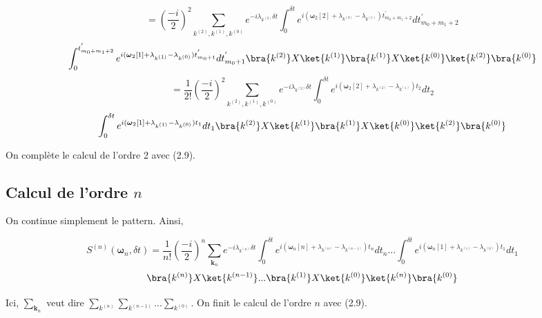 \begin{equation*}
    = \left(\frac{-i}{2}\right)^2 \sum_{k^{(2)},k^{(1)},k^{(0)}} e^{-i\lambda_{k^{(2)}}\delta t}\int_{0}^{\delta t} e^{i(\boldsymbol{\omega}_2[2] + \lambda_{k^{(2)}} - \lambda_{k^{(1)}})t^{'}_{m_0+m_1+2}}dt^{'}_{m_0+m_1+2}
\end{equation*}
\begin{equation*}
    \int_{0}^{t^{'}_{m_0+m_1+2}}e^{i(\boldsymbol{\omega}_2[1] + \lambda_{k^{(1)}} - \lambda_{k^{(0)}})t^{'}_{m_0+1}}dt^{'}_{m_0+1}\bra{k^{(2)}}X \ket{k^{(1)}}\bra{k^{(1)}}X \ket{k^{(0)}}\ket{k^{(2)}}\bra{k^{(0)}}
\end{equation*}
\begin{equation*}
    = \frac{1}{2!}\left(\frac{-i}{2}\right)^2 \sum_{k^{(2)},k^{(1)},k^{(0)}} e^{-i\lambda_{k^{(2)}}\delta t}\int_{0}^{\delta t} e^{i(\boldsymbol{\omega}_2[2] + \lambda_{k^{(2)}} - \lambda_{k^{(1)}})t_2}dt_2
\end{equation*}
\begin{equation*}
    \int_{0}^{\delta t}e^{i(\boldsymbol{\omega}_2[1] + \lambda_{k^{(1)}} - \lambda_{k^{(0)}})t_1}dt_1\bra{k^{(2)}}X \ket{k^{(1)}}\bra{k^{(1)}}X \ket{k^{(0)}}\ket{k^{(2)}}\bra{k^{(0)}}
\end{equation*}

On complète le calcul de l'ordre 2 avec (2.9).

\subsection{Calcul de l'ordre $n$}
On continue simplement le pattern. Ainsi,

\begin{equation*}
    S^{(n)}(\boldsymbol{\omega}_n, \delta t) = \frac{1}{n!}\left(\frac{-i}{2}\right)^n \sum_{\boldsymbol{k}_n}e^{-i\lambda_{k^{(n)}}\delta t}\int_{0}^{\delta t}e^{i(\boldsymbol{\omega}_n[n] + \lambda_{k^{(n)}} - \lambda_{k^{(n-1)}})t_n}dt_n ... \int_{0}^{\delta t}e^{i(\boldsymbol{\omega}_n[1] + \lambda_{k^{(1)}} - \lambda_{k^{(0)}})t_1}dt_1 
\end{equation*}
\begin{equation*}
    \bra{k^{(n)}}X \ket{k^{(n-1)}}...\bra{k^{(1)}}X \ket{k^{(0)}}\ket{k^{(n)}}\bra{k^{(0)}}
\end{equation*}

Ici, $\sum_{\boldsymbol{k}_n}$ veut dire $\sum_{k^{(n)}}\sum_{k^{(n-1)}}...\sum_{k^{(0)}}$. On finit le calcul de l'ordre $n$ avec (2.9).


